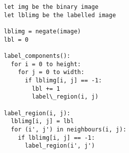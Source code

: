 


\begin{lstlisting}[caption=Recursive Connected Component Labelling (DFS), label=alg:ccl-recursive]
let img be the binary image
let lblimg be the labelled image

lblimg = negate(image)
lbl = 0

label_components():
  for i = 0 to height:
    for j = 0 to width:
      if lblimg[i, j] == -1:
        lbl += 1
        label\_region(i, j)

label_region(i, j):
  lblimg[i, j] = lbl
  for (i', j') in neighbours(i, j):
    if lblimg[i, j] == -1:
      label_region(i', j')
\end{lstlisting}
